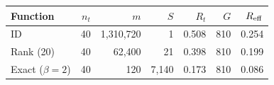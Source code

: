 \begin{tabular}{lrrrrrr}
\hline
Function & $n_t$ & $m$ & $S$ & $R_t$ & $G$ & $R_{\rm eff}$\\
\hline
ID & 40 & 1,310,720 & 1 & 0.508 & 810 & 0.254\\
Rank (20) & 40 & 62,400 & 21 & 0.398 & 810 & 0.199\\
Exact ($\beta=2$) & 40 & 120 & 7,140 & 0.173 & 810 & 0.086\\
\hline
\end{tabular}
